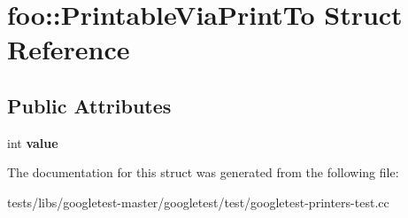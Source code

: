 \hypertarget{structfoo_1_1PrintableViaPrintTo}{}\section{foo\+:\+:Printable\+Via\+Print\+To Struct Reference}
\label{structfoo_1_1PrintableViaPrintTo}
\subsection*{Public Attributes}
\begin{DoxyCompactItemize}
\item 
\mbox{\label{structfoo_1_1PrintableViaPrintTo_a16f8c6420275d86f0d0112ca5a41bca2}} 
int {\bfseries value}
\end{DoxyCompactItemize}


The documentation for this struct was generated from the following file\+:\begin{DoxyCompactItemize}
\item 
tests/libs/googletest-\/master/googletest/test/googletest-\/printers-\/test.\+cc\end{DoxyCompactItemize}
